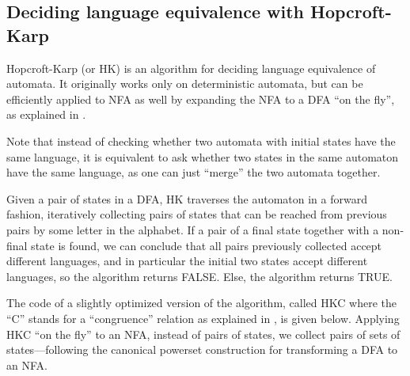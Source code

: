 \subsection{Deciding language equivalence with Hopcroft-Karp}

Hopcroft-Karp (or HK) is an algorithm for deciding language equivalence of automata. It originally works only on deterministic automata, but can be efficiently applied to NFA as well by expanding the NFA to a DFA ``on the fly'', as explained in \citep{hkc}.

Note that instead of checking whether two automata with initial states have the same language, it is equivalent to ask whether two states in the same automaton have the same language, as one can just ``merge'' the two automata together.

Given a pair of states in a DFA, HK traverses the automaton in a forward fashion, iteratively collecting pairs of states that can be reached from previous pairs by some letter in the alphabet. If a pair of a final state together with a non-final state is found, we can conclude that all pairs previously collected accept different languages, and in particular the initial two states accept different languages, so the algorithm returns FALSE. Else, the algorithm returns TRUE.

The code of a slightly optimized version of the algorithm, called HKC where the ``C'' stands for a ``congruence'' relation as explained in \citep{hkc}, is given below. Applying HKC ``on the fly'' to an NFA, instead of pairs of states, we collect pairs of sets of states---following the canonical powerset construction for transforming a DFA to an NFA.

